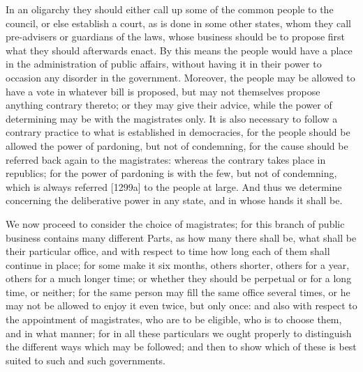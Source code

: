 In an oligarchy they should either call up some of the common people to
the council, or else establish a court, as is done in some other states,
whom they call pre-advisers or guardians of the laws, whose business
should be to propose first what they should afterwards enact. By this
means the people would have a place in the administration of public
affairs, without having it in their power to occasion any disorder in the
government. Moreover, the people may be allowed to have a vote in whatever
bill is proposed, but may not themselves propose anything contrary
thereto; or they may give their advice, while the power of determining may
be with the magistrates only. It is also necessary to follow a contrary
practice to what is established in democracies, for the people should be
allowed the power of pardoning, but not of condemning, for the cause
should be referred back again to the magistrates: whereas the contrary
takes place in republics; for the power of pardoning is with the few, but
not of condemning, which is always referred [1299a] to the people at
large. And thus we determine concerning the deliberative power in any
state, and in whose hands it shall be.


We now proceed to consider the choice of magistrates; for this branch of
public business contains many different Parts, as how many there shall be,
what shall be their particular office, and with respect to time how long
each of them shall continue in place; for some make it six months, others
shorter, others for a year, others for a much longer time; or whether they
should be perpetual or for a long time, or neither; for the same person
may fill the same office several times, or he may not be allowed to enjoy
it even twice, but only once: and also with respect to the appointment of
magistrates, who are to be eligible, who is to choose them, and in what
manner; for in all these particulars we ought properly to distinguish the
different ways which may be followed; and then to show which of these is
best suited to such and such governments.

